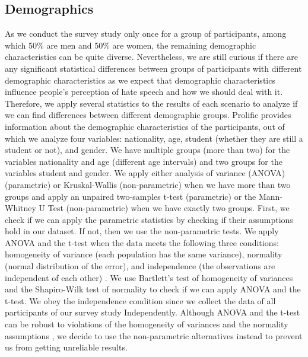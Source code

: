 \subsection{Demographics}
\label{sec:analysis-demographic}
As we conduct the survey study only once for a group of participants, among which 50\% are men and 50\% are women, the remaining demographic characteristics can be quite diverse.
%
Nevertheless, we are still curious if there are any significant statistical differences between groups of participants with different demographic characteristics as we expect that demographic characteristics influence people's perception of hate speech and how we should deal with it.
%
Therefore, we apply several statistics to the results of each scenario to analyze if we can find differences between different demographic groups.
%
Prolific provides information about the demographic characteristics of the participants, out of which we analyze four variables: nationality, age, student (whether they are still a student or not), and gender.
%
We have multiple groups (more than two) for the variables nationality and age (different age intervals) and two groups for the variables student and gender.
%
We apply either analysis of variance (ANOVA) (parametric) or Kruskal-Wallis (non-parametric) when we have more than two groups and apply an unpaired two-samples t-test (parametric) or the Mann-Whitney U Test (non-parametric) when we have exactly two groups.
%
First, we check if we can apply the parametric statistics by checking if their assumptions hold in our dataset.
%
If not, then we use the non-parametric tests.
%
We apply ANOVA and the t-test when the data meets the following three conditions: homogeneity of variance (each population has the same variance), normality (normal distribution of the error), and independence (the observations are independent of each other) \citep{howell2012statistical}.
%
We use Bartlett's test of homogeneity of variances and the Shapiro-Wilk test of normality to check if we can apply ANOVA and the t-test.
%
We obey the independence condition since we collect the data of all participants of our survey study Independently.
%
Although ANOVA and the t-test can be robust to violations of the homogeneity of variances and the normality assumptions \citep{howell2012statistical}, we decide to use the non-parametric alternatives instead to prevent us from getting unreliable results.